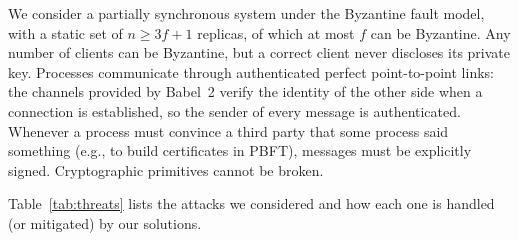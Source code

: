 \documentclass[sigconf,a4paper]{acmart}
\begin{document}
    We consider a partially synchronous system under the Byzantine fault model,
    with a static set of $n \ge 3f+1$ replicas, of which at most $f$ can be
    Byzantine. Any number of clients can be Byzantine, but a correct client never
    discloses its private key. Processes communicate through authenticated perfect
    point-to-point links: the channels provided by Babel~2 verify the identity of
    the other side when a connection is established, so the sender of every
    message is authenticated. Whenever a process must convince a third party that
    some process said something (e.g., to build certificates in PBFT), messages
    must be explicitly signed. Cryptographic primitives cannot be broken.

    Table~\ref{tab:threats} lists the attacks we considered and how each one is
    handled (or mitigated) by our solutions.
\end{document}
